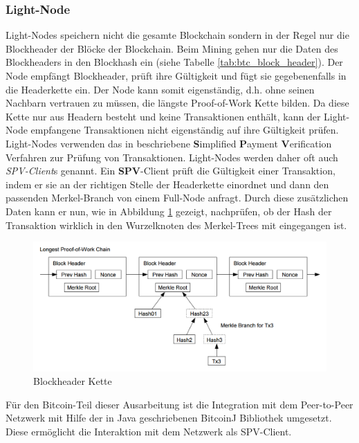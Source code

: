 \subsubsection{Light-Node}
Light-Nodes speichern nicht die gesamte Blockchain sondern in der Regel nur die Blockheader der Blöcke der Blockchain. Beim Mining gehen nur die Daten des Blockheaders in den Blockhash ein (siehe Tabelle \ref{tab:btc_block_header}). Der Node empfängt Blockheader, prüft ihre Gültigkeit und fügt sie gegebenenfalls in die Headerkette ein. Der Node kann somit eigenständig, d.h. ohne seinen Nachbarn vertrauen zu müssen, die längste Proof-of-Work Kette bilden. Da diese Kette nur aus Headern besteht und keine Transaktionen enthält, kann der Light-Node empfangene Transaktionen nicht eigenständig auf ihre Gültigkeit prüfen. Light-Nodes verwenden das in \cite{bitcoin_white_paper} beschriebene \textbf{S}implified \textbf{P}ayment \textbf{V}erification Verfahren zur Prüfung von Transaktionen. Light-Nodes werden daher oft auch \textit{SPV-Client}s genannt. Ein \textbf{SPV}-Client prüft die Gültigkeit einer Transaktion, indem er sie an der richtigen Stelle der Headerkette einordnet und dann den passenden Merkel-Branch von einem Full-Node anfragt. Durch diese zusätzlichen Daten kann er nun, wie in Abbildung \ref{fig:spv_chain} gezeigt, nachprüfen, ob der Hash der Transaktion wirklich in den Wurzelknoten des Merkel-Trees mit eingegangen ist.

\begin{figure}[H]
\centering
\includegraphics[width=1\linewidth]{Figures/umsetzung_btc/spv_chain}
\decoRule
\caption{Blockheader Kette \cite{ethereum_white_paper}}
\label{fig:spv_chain}
\end{figure}

\noindent Für den Bitcoin-Teil dieser Ausarbeitung ist die Integration mit dem Peer-to-Peer Netzwerk mit Hilfe der in Java geschriebenen BitcoinJ \cite{bitcoinj} Bibliothek umgesetzt. Diese ermöglicht die Interaktion mit dem Netzwerk als SPV-Client.

